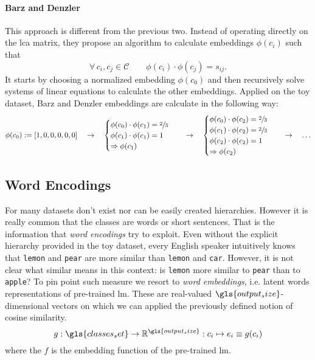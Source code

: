 \paragraph{Barz and Denzler~\cite{HierarchyBasedBarz2018}} This approach is
different from the previous two. Instead of operating directly on the lca
matrix, they propose an algorithm to calculate embeddings $\phi(c_i)$ such that
\begin{equation}
  \forall \, c_i, c_j \in \mathcal{C} \qquad
  \phi(c_i) \cdot \phi(c_j) = s_{ij}.
  \label{eq:bd-hierarchical-encoding}
\end{equation}
It starts by choosing a normalized embedding $\phi(c_0)$ and then recursively
solve systems of linear equations to calculate the other embeddings.
Applied on the toy dataset, Barz and Denzler embeddings are calculate in the
following way:
\begin{equation*}
  \phi{\left(c_0\right)} := \left[1, 0, 0, 0, 0, 0\right]
  \quad \rightarrow \quad
  \begin{cases}
    \phi{\left(c_0\right)} \cdot \phi{\left(c_1\right)} = \sfrac{2}{3} \\
    \phi{\left(c_1\right)} \cdot \phi{\left(c_1\right)} = 1 \\
    \Rightarrow  \phi{\left(c_1\right)}
  \end{cases}
  \quad \rightarrow \quad
  \begin{cases}
    \phi{\left(c_0\right)} \cdot \phi{\left(c_2\right)} = \sfrac{2}{3} \\
    \phi{\left(c_1\right)} \cdot \phi{\left(c_2\right)} = \sfrac{2}{3} \\
    \phi{\left(c_2\right)} \cdot \phi{\left(c_2\right)} = 1 \\
    \Rightarrow \phi{\left(c_2\right)}
  \end{cases}
  \quad \rightarrow \quad \ldots
\end{equation*}

\subsection{Word Encodings}
\label{subsec:word-encoding}
For many datasets don't exist nor can be easily created hierarchies. However it
is really common that the classes are words or short sentences. That is the
information that \emph{word encodings} try to exploit. Even without the explicit
hierarchy provided in the toy dataset, every English speaker intuitively knows
that \texttt{lemon} and \texttt{pear} are more similar than \texttt{lemon} and
\texttt{car}. However, it is not clear what similar means in this context: is
\texttt{lemon} more similar to \texttt{pear} than to \texttt{apple}? To pin
point such measure we resort to \emph{word embeddings}, i.e. latent words
representations of pre-trained \acrshort{lm}. These are real-valued
$\gls{output_size}$-dimensional vectors on which we can applied the previously
defined notion of cosine similarity.
\begin{equation}
  g : \gls{classes_set} \to \mathbb{R}^{\gls{output_size}} :
  c_i \mapsto e_i \equiv g(c_i)
  \label{eq:word-encoding}
\end{equation}
where the $f$ is the embedding function of the pre-trained \acrshort{lm}.

